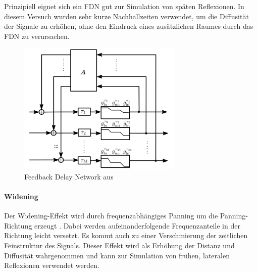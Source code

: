 Prinzipiell eignet sich ein FDN gut zur Simulation von späten Reflexionen. In diesem Versuch wurden sehr kurze Nachhallzeiten verwendet, um die Diffusität der Signale zu erhöhen, ohne den Eindruck eines zusätzlichen Raumes durch das FDN zu verursachen.

\begin{figure}[!ht]
  \centering
  \includegraphics[width=0.7\textwidth]{dekorrelation/pic/zotter_fdn.png}
  \caption{Feedback Delay Network aus \cite{ambi-book}}
  \label{fig:fdn}
\end{figure}


\paragraph{Widening}
Der Widening-Effekt wird durch frequenzabhängiges Panning um die Panning-Richtung erzeugt \cite{ambi-book}. Dabei werden aufeinanderfolgende Frequenzanteile in der Richtung leicht versetzt. Es kommt auch zu einer Verschmierung der zeitlichen Feinstruktur des Signals. Dieser Effekt wird als Erhöhung der Distanz und Diffusität wahrgenommen und kann zur Simulation von frühen, lateralen Reflexionen verwendet werden.
